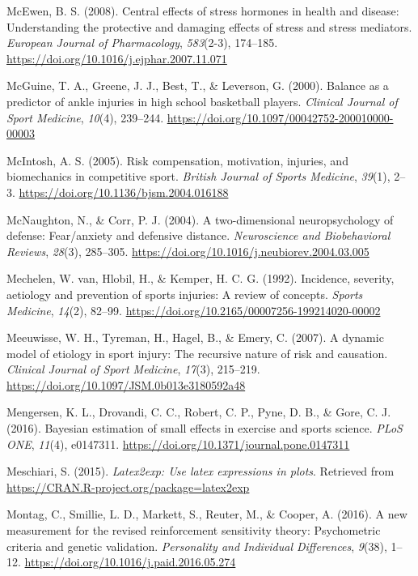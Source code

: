 \documentclass[
  english,
  man,floatsintext]{apa6}
\begin{document}
\leavevmode\hypertarget{ref-McEwen2008}{}%
McEwen, B. S. (2008). Central effects of stress hormones in health and disease: Understanding the protective and damaging effects of stress and stress mediators. \emph{European Journal of Pharmacology}, \emph{583}(2-3), 174--185. \url{https://doi.org/10.1016/j.ejphar.2007.11.071}

\leavevmode\hypertarget{ref-McGuine2000}{}%
McGuine, T. A., Greene, J. J., Best, T., \& Leverson, G. (2000). Balance as a predictor of ankle injuries in high school basketball players. \emph{Clinical Journal of Sport Medicine}, \emph{10}(4), 239--244. \url{https://doi.org/10.1097/00042752-200010000-00003}

\leavevmode\hypertarget{ref-McIntosh2005a}{}%
McIntosh, A. S. (2005). Risk compensation, motivation, injuries, and biomechanics in competitive sport. \emph{British Journal of Sports Medicine}, \emph{39}(1), 2--3. \url{https://doi.org/10.1136/bjsm.2004.016188}

\leavevmode\hypertarget{ref-McNaughton2004}{}%
McNaughton, N., \& Corr, P. J. (2004). A two-dimensional neuropsychology of defense: Fear/anxiety and defensive distance. \emph{Neuroscience and Biobehavioral Reviews}, \emph{28}(3), 285--305. \url{https://doi.org/10.1016/j.neubiorev.2004.03.005}

\leavevmode\hypertarget{ref-VanMechelen1992}{}%
Mechelen, W. van, Hlobil, H., \& Kemper, H. C. G. (1992). Incidence, severity, aetiology and prevention of sports injuries: A review of concepts. \emph{Sports Medicine}, \emph{14}(2), 82--99. \url{https://doi.org/10.2165/00007256-199214020-00002}

\leavevmode\hypertarget{ref-Meeuwisse2007}{}%
Meeuwisse, W. H., Tyreman, H., Hagel, B., \& Emery, C. (2007). A dynamic model of etiology in sport injury: The recursive nature of risk and causation. \emph{Clinical Journal of Sport Medicine}, \emph{17}(3), 215--219. \url{https://doi.org/10.1097/JSM.0b013e3180592a48}

\leavevmode\hypertarget{ref-Mengersen2016}{}%
Mengersen, K. L., Drovandi, C. C., Robert, C. P., Pyne, D. B., \& Gore, C. J. (2016). Bayesian estimation of small effects in exercise and sports science. \emph{PLoS ONE}, \emph{11}(4), e0147311. \url{https://doi.org/10.1371/journal.pone.0147311}

\leavevmode\hypertarget{ref-R-latex2exp}{}%
Meschiari, S. (2015). \emph{Latex2exp: Use latex expressions in plots}. Retrieved from \url{https://CRAN.R-project.org/package=latex2exp}

\leavevmode\hypertarget{ref-Reuter2015}{}%
Montag, C., Smillie, L. D., Markett, S., Reuter, M., \& Cooper, A. (2016). A new measurement for the revised reinforcement sensitivity theory: Psychometric criteria and genetic validation. \emph{Personality and Individual Differences}, \emph{9}(38), 1--12. \url{https://doi.org/10.1016/j.paid.2016.05.274}
\end{document}

